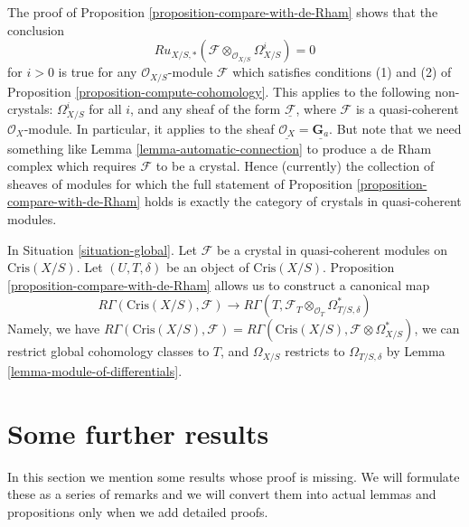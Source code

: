\begin{remark}
\label{remark-vanishing}
The proof of Proposition \ref{proposition-compare-with-de-Rham}
shows that the conclusion
$$
Ru_{X/S, *}(\mathcal{F} \otimes_{\mathcal{O}_{X/S}} \Omega^i_{X/S}) = 0
$$
for $i > 0$ is true for any $\mathcal{O}_{X/S}$-module
$\mathcal{F}$ which satisfies conditions (1) and (2) of
Proposition \ref{proposition-compute-cohomology}.
This applies to the following non-crystals:
$\Omega^i_{X/S}$ for all $i$, and any sheaf of the form
$\underline{\mathcal{F}}$, where $\mathcal{F}$ is a quasi-coherent
$\mathcal{O}_X$-module. In particular, it applies to the
sheaf $\underline{\mathcal{O}_X} = \underline{\mathbf{G}_a}$.
But note that we need something like Lemma \ref{lemma-automatic-connection}
to produce a de Rham complex which requires $\mathcal{F}$ to be a crystal.
Hence (currently) the collection of sheaves of modules for which the full
statement of Proposition \ref{proposition-compare-with-de-Rham} holds
is exactly the category of crystals in quasi-coherent modules.
\end{remark}

\noindent
In Situation \ref{situation-global}.
Let $\mathcal{F}$ be a crystal in quasi-coherent modules on
$\text{Cris}(X/S)$. Let $(U, T, \delta)$ be an object of
$\text{Cris}(X/S)$. Proposition \ref{proposition-compare-with-de-Rham}
allows us to construct a canonical map
\begin{equation}
\label{equation-restriction}
R\Gamma(\text{Cris}(X/S), \mathcal{F})
\longrightarrow
R\Gamma(T, \mathcal{F}_T \otimes_{\mathcal{O}_T} \Omega^*_{T/S, \delta})
\end{equation}
Namely, we have $R\Gamma(\text{Cris}(X/S), \mathcal{F}) =
R\Gamma(\text{Cris}(X/S), \mathcal{F} \otimes \Omega^*_{X/S})$,
we can restrict global cohomology classes to $T$, and $\Omega_{X/S}$
restricts to $\Omega_{T/S, \delta}$ by
Lemma \ref{lemma-module-of-differentials}.

















\section{Some further results}
\label{section-missing}

\noindent
In this section we mention some results whose proof is missing.
We will formulate these as a series of remarks and we will convert
them into actual lemmas and propositions only when we add detailed
proofs.

